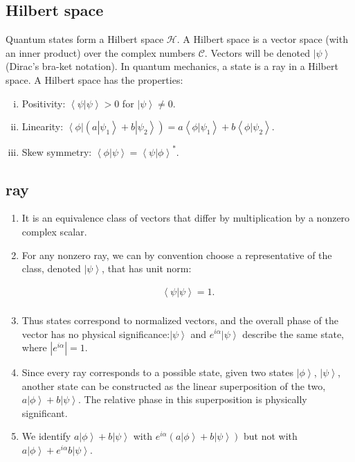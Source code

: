 \documentclass[onecolumn,pra,superscriptaddress,nofootinbib]{revtex4-1}
\newcommand{\bra}[1]{\mbox{$\left\langle #1 \right|$}}
\newcommand{\ket}[1]{\mbox{$\left| #1 \right\rangle$}}
\newcommand{\braket}[2]{\mbox{$\left\langle #1 | #2 \right\rangle$}}
\begin{document}
\subsection{Hilbert space}
Quantum states form a Hilbert space $\mathcal{H}$.  A Hilbert space is a vector space (with an inner product) over the complex numbers $\mathcal{C}$. Vectors will be denoted $\ket{\psi}$ (Dirac's bra-ket notation). In quantum mechanics, a state is a ray in a Hilbert space. A Hilbert space has the properties:
\begin{enumerate}[i)]
\item
Positivity: $\braket{\psi}{\psi}>0$ for $\ket{\psi}\ne0$.
\item
Linearity: $\bra{\phi}(a\ket{\psi_1}+b\ket{\psi_2})=a\braket{\phi}{\psi_1}+b\braket{\phi}{\psi_2}$.
\item
Skew symmetry: $\braket{\phi}{\psi}=\braket{\psi}{\phi}^*$.
\end{enumerate}


\subsection{ray}
\begin{enumerate}[$\cdot$]
\item It is an equivalence class of vectors that differ by
multiplication by a nonzero complex scalar.
\item For any nonzero ray, we can by convention choose a representative of the class, denoted $\ket{\psi}$, that has
unit norm:

\begin{equation} \label{ray}
\begin{aligned}
\braket{\psi}{\psi}=1.\\
\end{aligned}
\end{equation}
\item Thus states correspond to normalized vectors, and the overall phase of
the vector has no physical significance:$\ket{\psi}$ and $e^{i\alpha}\ket{\psi}$ describe the same
state, where $|e^{i\alpha}|=1$.
\item Since every ray corresponds to a possible state, given two states $\ket{\phi}$, $\ket{\psi}$,
another state can be constructed as the linear superposition of the two, $a\ket{\phi}+b\ket{\psi}$.
The relative phase in this superposition is physically significant.
\item We identify $a\ket{\phi}+b\ket{\psi}$ with $e^{i\alpha}(a\ket{\phi}+b\ket{\psi})$ but not with
$a\ket{\phi}+e^{i\alpha}b\ket{\psi}$.
\end{enumerate}
\end{document}
